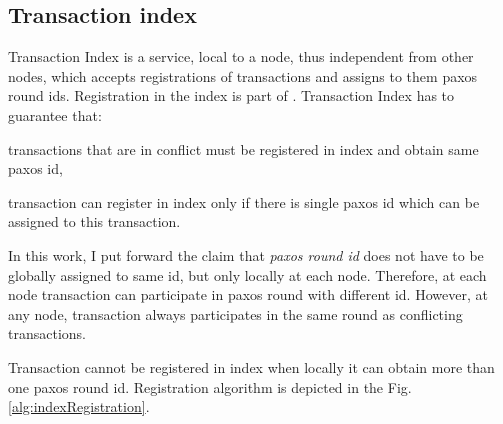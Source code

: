 
\subsection{Transaction index}
\label{sec:mpp:txIndex}
Transaction Index is a service, local to a node, thus independent from other nodes, which accepts registrations of transactions and assigns to them paxos round ids. Registration in the index is part of \mpt.
Transaction Index has to guarantee that: 
\begin{enumerate*}
\item transactions that are in conflict must be registered in index and obtain same paxos id,
\item transaction can register in index only if there is single paxos id which can be assigned to this transaction.
\end{enumerate*}

In this work, I put forward the claim that \emph{paxos round id} does not have to be globally assigned to same id, but only locally at each node. Therefore, at each node transaction can participate in paxos round with different id. However, at any node, transaction always participates in the same round as conflicting transactions.

Transaction cannot be registered in index when locally it can obtain more than one paxos round id. Registration algorithm is depicted in the Fig. \ref{alg:indexRegistration}.

